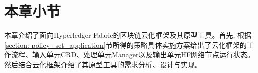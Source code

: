 \section{本章小节}

本章介绍了面向Hyperledger Fabric的区块链云化框架及其原型工具。首先, 根据\ref{section: policy_set_application}节所得的策略具体实施方案给出了云化框架的工作流程、输入单元CRD、处理单元Manager以及输出单元HF网络节点运行状态。然后结合云化框架介绍了其原型工具的需求分析、设计与实现。













